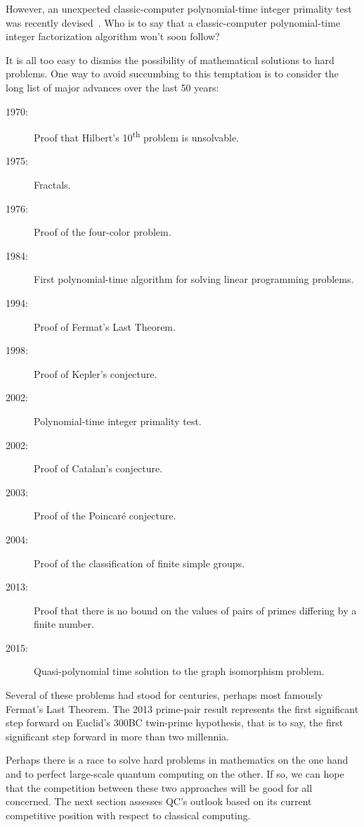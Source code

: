 However, an unexpected classic-computer
polynomial-time integer primality test was recently
devised~\cite{ManindraAgrawal2004PrimesIsInP,WikipediaAKSPrimalityTest}.
Who is to say that a classic-computer polynomial-time integer
factorization algorithm won't soon follow?

It is all too easy to dismiss the possibility of mathematical solutions
to hard problems.
One way to avoid succumbing to this temptation is to consider the
long list of major advances over the last 50 years:

\begin{description}
\item[1970:] Proof that Hilbert's 10\textsuperscript{th} problem
	is unsolvable.
\item[1975:] Fractals.
\item[1976:] Proof of the four-color problem.
\item[1984:] First polynomial-time algorithm for solving linear
	programming problems.
\item[1994:] Proof of Fermat's Last Theorem.
\item[1998:] Proof of Kepler's conjecture.
\item[2002:] Polynomial-time integer primality test.
\item[2002:] Proof of Catalan's conjecture.
\item[2003:] Proof of the Poincar\'e conjecture.
\item[2004:] Proof of the classification of finite simple groups.
\item[2013:] Proof that there is no bound on the values of
	pairs of primes differing by a finite number.
\item[2015:] Quasi-polynomial time solution to the graph isomorphism
	problem.
\end{description}

Several of these problems had stood for centuries, perhaps most famously
Fermat's Last Theorem.
The 2013 prime-pair result represents the first significant step forward
on Euclid's 300BC twin-prime hypothesis, that is to say, the first
significant step forward in more than two millennia.

Perhaps there is a race to solve hard problems in mathematics on
the one hand and to perfect large-scale quantum computing on
the other.
If so, we can hope that the competition between these two approaches
will be good for all concerned.
The next section assesses QC's outlook based on its current
competitive position with respect to classical computing.

